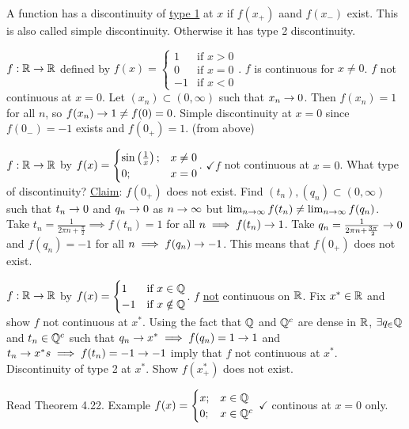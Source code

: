 \documentclass[]{article}
\begin{document}
\begin{definition}
	A function has a discontinuity of \ul{type 1} at $x$ if $f(x_+)$ aand $f(x_-)$ exist.
	This is also called simple discontinuity.
	Otherwise it has type 2 discontinuity.
\end{definition}
\begin{example}
$f:\mathbb{R}\rightarrow\mathbb{R}$ defined by $f(x) = \begin{cases} 1 & \text{if }x>0 \\ 0 & \text{if }x=0 \\ -1 & \text{if }x<0 \end{cases}$.
	$f$ is continuous for $x\neq0$. $f$ not continuous at $x=0$.
	Let $(x_n)\subset(0,\infty)$ such that $x_n\rightarrow0$.
	Then $f(x_n) = 1$ for all $n$, so $f(x_n)\rightarrow1\neq f(0)=0$.
	Simple discontinuity at $x=0$ since $f(0_-)=-1$ exists and $f(0_+)=1$. (from above)
\end{example}
\begin{example}
$f:\mathbb{R}\rightarrow\mathbb{R}$ by $f(x) = \begin{cases} \sin\left(\frac1x\right); & x\neq0 \\ 0; & x=0 \end{cases}$.
	$\checkmark f$ not continuous at $x=0$. What type of discontinuity?
	\ul{Claim}: $f(0_+)$ does not exist.
	Find $(t_n),(q_n)\subset(0,\infty)$ such that $t_n\rightarrow0$ and $q_n\rightarrow0$ as $n\rightarrow\infty$ but $\lim_{n\rightarrow\infty}f(t_n)\neq\lim_{n\rightarrow\infty}f(q_n)$.
	Take $t_n=\frac1{2\pi n+\frac\pi2}\implies f(t_n)=1$ for all $n \implies f(t_n)\rightarrow1$.
	Take $q_n=\frac1{2\pi n+\frac{3\pi}2} \rightarrow 0$ and $f(q_n) = -1$ for all $n \implies f(q_n)\rightarrow -1$.
	This means that $f(0_+)$ does not exist.
\end{example}
\begin{example}
	$f:\mathbb{R}\rightarrow\mathbb{R}$ by $f(x) = \begin{cases} 1 & \text{if }x\in\mathbb{Q} \\ -1 & \text{if }x\notin \mathbb{Q} \end{cases}$.
	$f$ \ul{not} continuous on $\mathbb{R}$.
	Fix $x^*\in\mathbb{R}$ and show $f$ not continuous at $x^*$.
	Using the fact that $\mathbb{Q}$ and $\mathbb{Q}^c$ are dense in $\mathbb{R}$, $\exists q_\in\mathbb{Q}$ and $t_n\in\mathbb{Q}^c$ such that $q_n\rightarrow x^*\implies f(q_n)=1\rightarrow 1$ and $t_n\rightarrow x^*s \implies f(t_n)=-1\rightarrow -1$ imply that $f$ not continuous at $x^*$.
	Discontinuity of type 2 at $x^*$.
	Show $f(x^*_+)$ does not exist.
\end{example}
Read Theorem 4.22. Example $f(x) = \begin{cases} x; & x\in\mathbb{Q} \\ 0; & x\in\mathbb{Q}^c \end{cases}$ $\checkmark$ continous at $x=0$ only.
\end{document}
